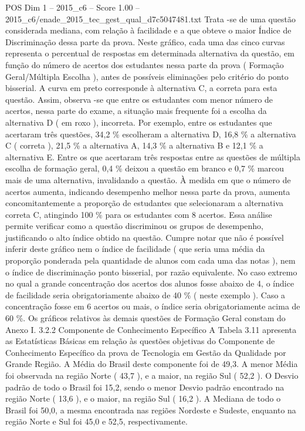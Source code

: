 \begin{textsample}{POS Dim 1 – 2015\_c6 – Score 1.00 – 2015\_c6/enade\_2015\_tec\_gest\_qual\_d7c5047481.txt}
Trata -se de uma questão considerada mediana, com relação à facilidade e a que obteve o maior Índice de Discriminação dessa parte da prova.
Neste gráfico, cada uma das cinco curvas representa o percentual de respostas em determinada alternativa da questão, em função do número de acertos dos estudantes nessa parte da prova ( Formação Geral/Múltipla Escolha ), antes de possíveis eliminações pelo critério do ponto bisserial.
A curva em preto corresponde à alternativa C, a correta para esta questão.
Assim, observa -se que entre os estudantes com menor número de acertos, nessa parte do exame, a situação mais frequente foi a escolha da alternativa D ( em roxo ), incorreta.
Por exemplo, entre os estudantes que acertaram três questões, 34,2 \% escolheram a alternativa D, 16,8 \% a alternativa C ( correta ), 21,5 \% a alternativa A, 14,3 \% a alternativa B e 12,1 \% a alternativa E.
Entre os que acertaram três respostas entre as questões de múltipla escolha de formação geral, 0,4 \% deixou a questão em branco e 0,7 \% marcou mais de uma alternativa, invalidando a questão.
À medida em que o número de acertos aumenta, indicando desempenho melhor nessa parte da prova, aumenta concomitantemente a proporção de estudantes que selecionaram a alternativa correta C, atingindo 100 \% para os estudantes com 8 acertos.
Essa análise permite verificar como a questão discriminou os grupos de desempenho, justificando o alto índice obtido na questão.
Cumpre notar que não é possível inferir deste gráfico nem o índice de facilidade ( que seria uma média da proporção ponderada pela quantidade de alunos com cada uma das notas ), nem o índice de discriminação ponto bisserial, por razão equivalente.
No caso extremo no qual a grande concentração dos acertos dos alunos fosse abaixo de 4, o índice de facilidade seria obrigatoriamente abaixo de 40 \% ( neste exemplo ).
Caso a concentração fosse em 6 acertos ou mais, o índice seria obrigatoriamente acima de 60 \%.
Os gráficos relativos às demais questões de Formação Geral constam do Anexo I. 3.2.2 Componente de Conhecimento Específico A Tabela 3.11 apresenta as Estatísticas Básicas em relação às questões objetivas do Componente de Conhecimento Específico da prova de Tecnologia em Gestão da Qualidade por Grande Região.
A Média do Brasil deste componente foi de 49,3.
A menor Média foi observada na região Norte ( 43,7 ), e a maior, na região Sul ( 52,2 ).
O Desvio padrão de todo o Brasil foi 15,2, sendo o menor Desvio padrão encontrado na região Norte ( 13,6 ), e o maior, na região Sul ( 16,2 ).
A Mediana de todo o Brasil foi 50,0, a mesma encontrada nas regiões Nordeste e Sudeste, enquanto na região Norte e Sul foi 45,0 e 52,5, respectivamente.

\end{textsample}
